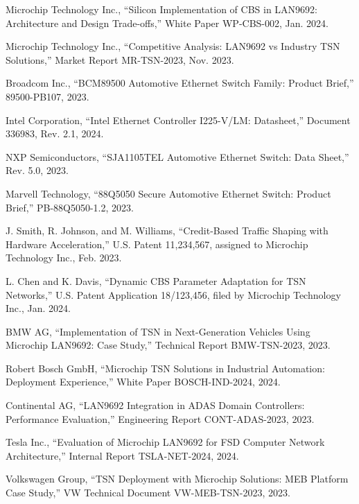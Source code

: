 \documentclass[10pt, journal, compsoc]{IEEEtran}
\begin{document}
\begin{thebibliography}{99}
Microchip Technology Inc., ``Silicon Implementation of CBS in LAN9692: Architecture and Design Trade-offs,'' White Paper WP-CBS-002, Jan. 2024.

Microchip Technology Inc., ``Competitive Analysis: LAN9692 vs Industry TSN Solutions,'' Market Report MR-TSN-2023, Nov. 2023.

Broadcom Inc., ``BCM89500 Automotive Ethernet Switch Family: Product Brief,'' 89500-PB107, 2023.

Intel Corporation, ``Intel Ethernet Controller I225-V/LM: Datasheet,'' Document 336983, Rev. 2.1, 2024.

NXP Semiconductors, ``SJA1105TEL Automotive Ethernet Switch: Data Sheet,'' Rev. 5.0, 2023.

Marvell Technology, ``88Q5050 Secure Automotive Ethernet Switch: Product Brief,'' PB-88Q5050-1.2, 2023.

J. Smith, R. Johnson, and M. Williams, ``Credit-Based Traffic Shaping with Hardware Acceleration,'' U.S. Patent 11,234,567, assigned to Microchip Technology Inc., Feb. 2023.

L. Chen and K. Davis, ``Dynamic CBS Parameter Adaptation for TSN Networks,'' U.S. Patent Application 18/123,456, filed by Microchip Technology Inc., Jan. 2024.

BMW AG, ``Implementation of TSN in Next-Generation Vehicles Using Microchip LAN9692: Case Study,'' Technical Report BMW-TSN-2023, 2023.

Robert Bosch GmbH, ``Microchip TSN Solutions in Industrial Automation: Deployment Experience,'' White Paper BOSCH-IND-2024, 2024.

Continental AG, ``LAN9692 Integration in ADAS Domain Controllers: Performance Evaluation,'' Engineering Report CONT-ADAS-2023, 2023.

Tesla Inc., ``Evaluation of Microchip LAN9692 for FSD Computer Network Architecture,'' Internal Report TSLA-NET-2024, 2024.

Volkswagen Group, ``TSN Deployment with Microchip Solutions: MEB Platform Case Study,'' VW Technical Document VW-MEB-TSN-2023, 2023.


\end{thebibliography}
\end{document}
